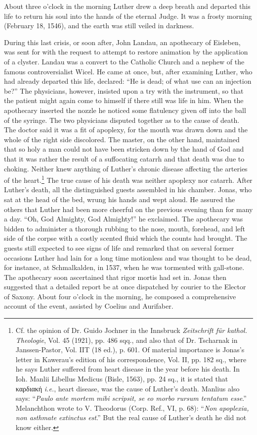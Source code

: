 About three o’clock in the morning Luther drew a deep breath and
departed this life to return his soul into the hands of the eternal
Judge. It was a frosty morning (February 18, 1546), and the earth
was still veiled in darkness.

During this last crisis, or soon after, John Landau, an apothecary
of Eisleben, was sent for with the request to attempt to restore animation
by the application of a clyster. Landau was a convert to the
Catholic Church and a nephew of the famous controversialist Wicel.
He came at once, but, after examining Luther, who had already departed
this life, declared: “He is dead; of what use can an injection
be?” The physicians, however, insisted upon a try with the instrument,
so that the patient might again come to himself if there still
was life in him. When the apothecary inserted the nozzle he noticed
some flatulency given off into the ball of the syringe. The two physicians
disputed together as to the cause of death. The doctor said
it was a fit of apoplexy, for the mouth was drawn down and the
whole of the right side discolored. The master, on the other hand,
maintained that so holy a man could not have been stricken down
by the hand of God and that it was rather the result of a suffocating
catarrh and that death was due to choking. Neither knew anything of
Luther’s chronic disease affecting the arteries of the heart.\footnote
{Cf. the opinion of Dr. Guido Jochner in the Innsbruck \textit{Zeitschrift für kathol. Theologie},
Vol. 45 (1921), pp. 486 sqq., and also that of Dr. Tscharnak in Janssen-Pastor, Vol.
IIT (18 ed.), p. 601. Of material importance is Jonas’s letter in Kawerau’s edition of his
correspondence, Vol. II, pp. 182 sq., where he says Luther suffered from heart disease in
the year before his death. In Ioh. Manlii Libellus Medicus (Bisle, 1563), pp. 24 sq., it
is stated that
καρδιακή
\textit{i.e.}, heart disease, was the cause of Luther’s death. Manlius also says:
“\textit{Paulo ante mortem mibi scripsit, se eo morbo rursum tentatum esse}.” Melanchthon wrote
to V. Theodorus (Corp. Ref., VI, p. 68): “\textit{Non apoplexia, non asthmate extinctus est}.”
But the real cause of Luther’s death he did not know either.}
The true
cause of his death was neither apoplexy nor catarrh.
After Luther’s death, all the distinguished guests assembled in his
chamber. Jonas, who sat at the head of the bed, wrung his hands
and wept aloud. He assured the others that Luther had been more
cheerful on the previous evening than for many a day. “Oh, God
Almighty, God Almighty!” he exclaimed. The apothecary was bidden to administer
a thorough rubbing to the nose, mouth, forehead,
and left side of the corpse with a costly scented fluid which the counts
had brought. The guests still expected to see signs of life and remarked
that on several former occasions Luther had lain for a long
time motionless and was thought to be dead, for instance, at Schmalkalden,
in 1537, when he was tormented with gall-stone. The apothecary soon
ascertained that rigor mortis had set in. Jonas then suggested
that a detailed report be at once dispatched by courier to the Elector
of Saxony. About four o’clock in the morning, he composed a comprehensive
account of the event, assisted by Coelius and Aurifaber.

